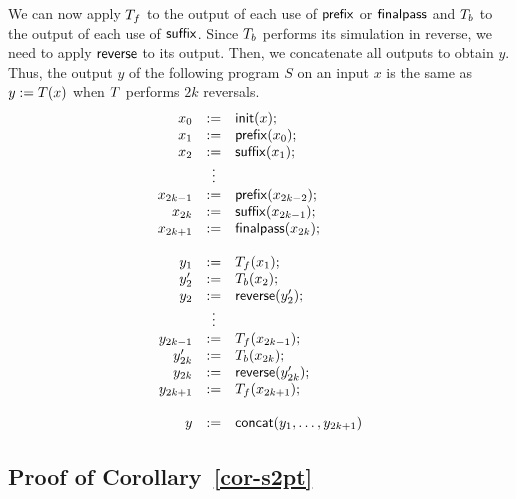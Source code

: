 We can now apply $T_f$ to the output of each use of $\mathsf{prefix}$ or
$\mathsf{finalpass}$ and $T_b$ to the output of each use of $\mathsf{suffix}$.
%
Since $T_b$ performs its simulation in reverse, we need to apply
$\mathsf{reverse}$ to its output.
%
Then, we concatenate all outputs to obtain $y$.
%
Thus, the output $y$ of the following program $S$ on an input $x$ is the same
as
$y := T(x)$
when $T$ performs $2k$ reversals.
\[
    \begin{array}{rcl}
        x_0 &:=& \mathsf{init}(x); \\
        x_1 &:=& \mathsf{prefix}(x_0); \\
        x_2 &:=& \mathsf{suffix}(x_1); \\
        &\vdots& \\
        x_{2k-1} &:=& \mathsf{prefix}(x_{2k-2}); \\
        x_{2k} &:=& \mathsf{suffix}(x_{2k-1}); \\
        x_{2k+1} &:=& \mathsf{finalpass}(x_{2k}); \\
        \\
        y_1 &:=& T_f(x_1); \\
        y'_2 &:=& T_b(x_2); \\
        y_2 &:=& \mathsf{reverse}(y'_2); \\
        &\vdots& \\
        y_{2k-1} &:=& T_f(x_{2k-1}); \\
        y'_{2k} &:=& T_b(x_{2k}); \\
        y_{2k} &:=& \mathsf{reverse}(y'_{2k}); \\
        y_{2k+1} &:=& T_f(x_{2k+1}); \\
        \\
        y &:=& \mathsf{concat}(y_1, \ldots, y_{2k+1})
    \end{array}
\]






\subsection{Proof of Corollary~\ref{cor-s2pt}}

